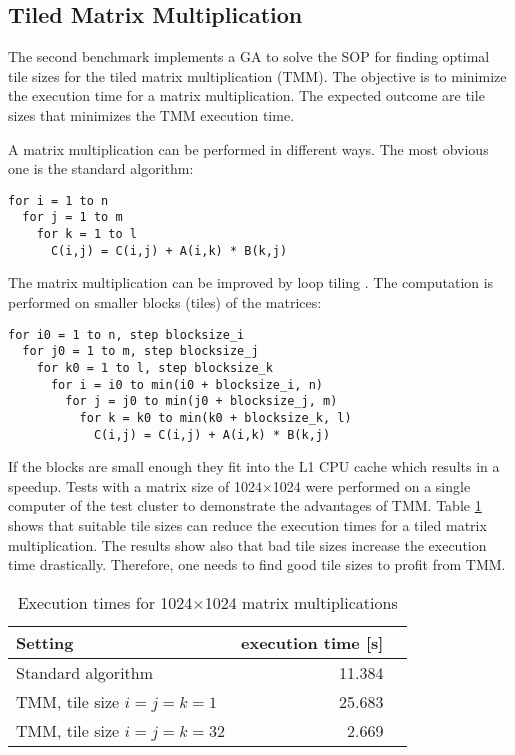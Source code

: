 \subsection{Tiled Matrix Multiplication}
\label{chap:evaluation:tiledmul}
The second benchmark implements a GA to solve the SOP for finding optimal tile sizes for the tiled matrix multiplication (TMM). The objective is to minimize the execution time for a matrix multiplication. The expected outcome are tile sizes that minimizes the TMM execution time.

A matrix multiplication can be performed in different ways. The most obvious one is the standard algorithm:
\begin{lstlisting}
for i = 1 to n
  for j = 1 to m
    for k = 1 to l
      C(i,j) = C(i,j) + A(i,k) * B(k,j)
\end{lstlisting}

The matrix multiplication can be improved by loop tiling \cite{wolfe1989more}. The computation is performed on smaller blocks (tiles) of the matrices:
\begin{lstlisting}
for i0 = 1 to n, step blocksize_i
  for j0 = 1 to m, step blocksize_j
    for k0 = 1 to l, step blocksize_k
      for i = i0 to min(i0 + blocksize_i, n)
        for j = j0 to min(j0 + blocksize_j, m)
          for k = k0 to min(k0 + blocksize_k, l)
            C(i,j) = C(i,j) + A(i,k) * B(k,j)
\end{lstlisting}

If the blocks are small enough they fit into the L1 CPU cache which results in a speedup. Tests with a matrix size of 1024$\times$1024 were performed on a single computer of the test cluster to demonstrate the advantages of TMM. Table \ref{table:mm_comparison} shows that suitable tile sizes can reduce the execution times for a tiled matrix multiplication. The results show also that bad tile sizes increase the execution time drastically. Therefore, one needs to find good tile sizes to profit from TMM.

\begin{table}
  \centering
  \caption{Execution times for 1024$\times$1024 matrix multiplications}
  \begin{tabular}{lrr}\toprule[2pt]
    Setting & execution time [s] \\ \midrule
    Standard algorithm & 11.384 \\
    TMM, tile size $i=j=k=1$ & 25.683 & \\
    TMM, tile size $i=j=k=32$ & 2.669 &  \\
  \end{tabular}
  \label{table:mm_comparison}
\end{table}

